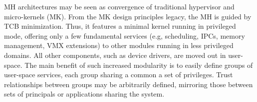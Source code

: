 \documentclass{sig-alternate}
\begin{document}
MH architectures may be seen as convergence of traditional hypervisor and micro-kernels (MK).
From the MK design principles legacy, the MH is guided by TCB minimization. 
Thus, it features a minimal kernel running in privileged mode, offering only a few fundamental services (e.g, scheduling, IPCs, memory management, VMX extensions) to other modules running in less privileged domains. All other components, such as device drivers, are moved out in user-space. 
The main benefit of such increased modularity is
%
to easily define groups of user-space services, each group sharing a common a set of privileges. Trust relationships between groups may be arbitrarily defined, mirroring those between sets of principals or applications sharing the system. 
\end{document}
